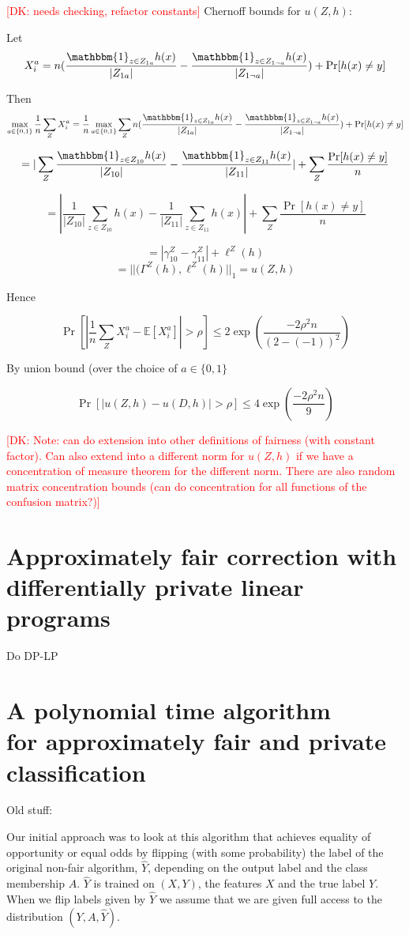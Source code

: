 \documentclass[runningheads]{article}
\newcommand{\dk}[1]{\textcolor{red}{[DK: #1]}}
\newcommand{\1}{\mathbbm{1}}
\theoremstyle{definition}
\begin{document}
\dk {needs checking, refactor constants}
Chernoff bounds for $u(Z,h)$:

Let $$X_i^a = n(\frac{\1_{z\in Z_{1a}}h(x)}{|Z_{1a}|} - \frac{\1_{z\in Z_{1\neg a}}h(x)}{|Z_{1 \neg a}|} ) + \Pr[h(x) \neq y]$$

Then $$\max_{a\in \{0,1\}}\frac{1}{n} \sum_Z X_i^a =\frac{1}{n}  \max_{a\in \{0,1\}} \sum_Z n(\frac{\1_{z\in Z_{1a}}h(x)}{|Z_{1a}|} - \frac{\1_{z\in Z_{1\neg a}}h(x)}{|Z_{1 \neg a}|} ) + \Pr[h(x) \neq y]$$

$$= |\sum_Z \frac{\1_{z\in Z_{10}}h(x)}{|Z_{10}|} - \frac{\1_{z\in Z_{11}}h(x)}{|Z_{11}|}| +  \sum_Z \frac{\Pr[h(x) \neq y] }{n}$$

$$= |\frac{1}{|Z_{10}|} \sum_{z\in Z_{10}} h(x) - \frac{1}{|Z_{11}|} \sum_{z\in Z_{11}} h(x)| +  \sum_Z \frac{\Pr[h(x) \neq y] }{n}$$

$$=|\gamma_{10}^Z - \gamma_{11}^Z| + \ell^Z(h) $$
$$=||(\Gamma^Z(h), \ell^Z(h)||_{1} = u(Z,h)$$

Hence

$$\Pr[|\frac{1}{n} \sum_Z X_i^a - \mathbb{E}[X_i^a]| > \rho] \leq 2\exp(\frac{-2\rho^2n}{(2-(-1))^2})$$

By union bound (over the choice of $a \in \{0,1\}$

$$\Pr[|u(Z,h) - u(D,h)| > \rho] \leq 4\exp(\frac{-2\rho^2n}{9})$$

\dk {Note: can do extension into other definitions of fairness (with constant factor).
Can also extend into a different norm for $u(Z,h)$ if we have a concentration of measure theorem for the different norm. There are also random matrix concentration bounds (can do concentration for all functions of the confusion matrix?)}

\section{Approximately fair correction with differentially private linear programs}
Do DP-LP

\section{A polynomial time algorithm \\for approximately fair and private classification}
\clearpage

Old stuff:

Our initial approach was to look at this algorithm that achieves equality of opportunity or equal odds by flipping (with some probability) the label of the original non-fair algorithm, $\hat{Y}$, depending on the output label and the class membership $A$. $\hat{Y}$ is trained on $(X,Y)$, the features $X$ and the true label $Y$. When we flip labels given by $\hat{Y}$ we assume that we are given full access to the distribution $(Y,A,\hat{Y})$.
\end{document}
